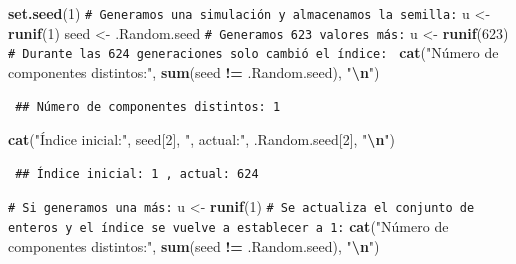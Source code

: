 \documentclass[
  spanish,
  10pt,
]{book}
\newenvironment{Shaded}{\begin{snugshade}}{\end{snugshade}}
\newcommand{\CommentTok}[1]{\textcolor[rgb]{0.56,0.35,0.01}{\textit{#1}}}
\newcommand{\DecValTok}[1]{\textcolor[rgb]{0.00,0.00,0.81}{#1}}
\newcommand{\FunctionTok}[1]{\textcolor[rgb]{0.13,0.29,0.53}{\textbf{#1}}}
\newcommand{\NormalTok}[1]{#1}
\newcommand{\OtherTok}[1]{\textcolor[rgb]{0.56,0.35,0.01}{#1}}
\newcommand{\SpecialCharTok}[1]{\textcolor[rgb]{0.81,0.36,0.00}{\textbf{#1}}}
\newcommand{\StringTok}[1]{\textcolor[rgb]{0.31,0.60,0.02}{#1}}
\theoremstyle{break}
\theoremstyle{nonumberplain}
\renewcommand{\CommentTok}[1]{\textcolor[rgb]{0.41,0.41,0.41}{\texttt{#1}}}
\begin{document}
\begin{Shaded}
\begin{Highlighting}[]
\FunctionTok{set.seed}\NormalTok{(}\DecValTok{1}\NormalTok{)}
\CommentTok{\# Generamos una simulación y almacenamos la semilla:}
\NormalTok{u }\OtherTok{\textless{}{-}} \FunctionTok{runif}\NormalTok{(}\DecValTok{1}\NormalTok{)}
\NormalTok{seed }\OtherTok{\textless{}{-}}\NormalTok{ .Random.seed}
\CommentTok{\# Generamos 623 valores más:}
\NormalTok{u }\OtherTok{\textless{}{-}} \FunctionTok{runif}\NormalTok{(}\DecValTok{623}\NormalTok{)}
\CommentTok{\# Durante las 624 generaciones solo cambió el índice: }
\FunctionTok{cat}\NormalTok{(}\StringTok{"Número de componentes distintos:"}\NormalTok{, }\FunctionTok{sum}\NormalTok{(seed }\SpecialCharTok{!=}\NormalTok{ .Random.seed), }\StringTok{"}\SpecialCharTok{\textbackslash{}n}\StringTok{"}\NormalTok{)}
\end{Highlighting}
\end{Shaded}

\begin{verbatim}
 ## Número de componentes distintos: 1
\end{verbatim}

\begin{Shaded}
\begin{Highlighting}[]
\FunctionTok{cat}\NormalTok{(}\StringTok{"Índice inicial:"}\NormalTok{, seed[}\DecValTok{2}\NormalTok{], }\StringTok{", actual:"}\NormalTok{, .Random.seed[}\DecValTok{2}\NormalTok{], }\StringTok{"}\SpecialCharTok{\textbackslash{}n}\StringTok{"}\NormalTok{)}
\end{Highlighting}
\end{Shaded}

\begin{verbatim}
 ## Índice inicial: 1 , actual: 624
\end{verbatim}

\begin{Shaded}
\begin{Highlighting}[]
\CommentTok{\# Si generamos una más:}
\NormalTok{u }\OtherTok{\textless{}{-}} \FunctionTok{runif}\NormalTok{(}\DecValTok{1}\NormalTok{)}
\CommentTok{\# Se actualiza el conjunto de enteros y el índice se vuelve a establecer a 1:}
\FunctionTok{cat}\NormalTok{(}\StringTok{"Número de componentes distintos:"}\NormalTok{, }\FunctionTok{sum}\NormalTok{(seed }\SpecialCharTok{!=}\NormalTok{ .Random.seed), }\StringTok{"}\SpecialCharTok{\textbackslash{}n}\StringTok{"}\NormalTok{)}
\end{Highlighting}
\end{Shaded}
\end{document}
